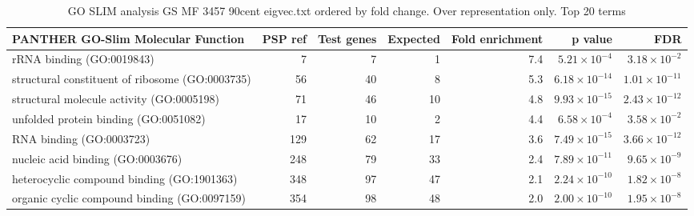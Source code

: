\begin{table}[ht]
\centering
\begin{adjustbox}{width=\textwidth}
\begin{tabular}{lrrrrrr}
  \hline
PANTHER GO-Slim Molecular Function & PSP ref & Test genes & Expected & Fold enrichment & p value & FDR \\ 
  \hline
rRNA binding (GO:0019843) & 7 & 7 & 1 & 7.4 & $5.21 \times 10^{-4}$ & $3.18 \times 10^{-2}$ \\ 
  structural constituent of ribosome (GO:0003735) & 56 & 40 & 8 & 5.3 & $6.18 \times 10^{-14}$ & $1.01 \times 10^{-11}$ \\ 
  structural molecule activity (GO:0005198) & 71 & 46 & 10 & 4.8 & $9.93 \times 10^{-15}$ & $2.43 \times 10^{-12}$ \\ 
  unfolded protein binding (GO:0051082) & 17 & 10 & 2 & 4.4 & $6.58 \times 10^{-4}$ & $3.58 \times 10^{-2}$ \\ 
  RNA binding (GO:0003723) & 129 & 62 & 17 & 3.6 & $7.49 \times 10^{-15}$ & $3.66 \times 10^{-12}$ \\ 
  nucleic acid binding (GO:0003676) & 248 & 79 & 33 & 2.4 & $7.89 \times 10^{-11}$ & $9.65 \times 10^{-9}$ \\ 
  heterocyclic compound binding (GO:1901363) & 348 & 97 & 47 & 2.1 & $2.24 \times 10^{-10}$ & $1.82 \times 10^{-8}$ \\ 
  organic cyclic compound binding (GO:0097159) & 354 & 98 & 48 & 2.0 & $2.00 \times 10^{-10}$ & $1.95 \times 10^{-8}$ \\ 
   \hline
\end{tabular}
\end{adjustbox}
\caption{GO SLIM analysis GS MF 3457 90cent eigvec.txt ordered by fold change. Over representation only. Top 20 terms} 
\label{tab:GO SLIM analysis GS MF 3457 90cent eigvec.txt ordered by fold change. Over representation only. Top 20 terms}
\end{table}



